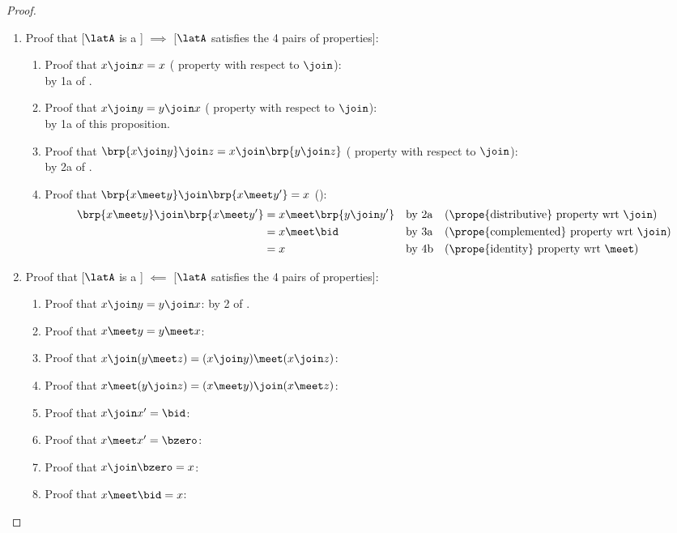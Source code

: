 \begin{proof}
\begin{enumerate}
  \item Proof that [$\latA$ is a ] $\implies$ [$\latA$ satisfies the 4 pairs of properties]:
    \begin{enumerate}
      \item Proof that $x \join  x = x$ ( property with respect to $\join$):
            \\by 1a of .
      \item Proof that $x \join  y = y \join  x$ ( property with respect to $\join$):
            \\by 1a of this proposition.
      \item Proof that $\brp{x \join  y}\join z = x \join \brp{y \join z}$ ( property with respect to $\join$):
            \\by 2a of .
      \item Proof that $\brp{x\meet y} \join \brp{x\meet y'} = x$ ():
        \begin{align*}
          \brp{x\meet y} \join \brp{x\meet y'}
            &= x \meet \brp{y \join y'}
            && \text{by 2a}
            && \text{(\prope{distributive} property wrt $\join$)}
          \\&= x \meet \bid
            && \text{by 3a}
            && \text{(\prope{complemented} property wrt $\join$)}
          \\&= x
            && \text{by 4b}
            && \text{(\prope{identity} property wrt $\meet$)}
        \end{align*}
    \end{enumerate}

  \item Proof that [$\latA$ is a ] $\impliedby$ [$\latA$ satisfies the 4 pairs of properties]:
    \begin{enumerate}
      \item Proof that $x \join  y =  y \join  x$: by 2 of .
      \item Proof that $x \meet  y =  y \meet  x$:
      \item Proof that $x\join( y\meet z) = ( x\join y) \meet ( x\join z)$:
      \item Proof that $x\meet( y\join z) = ( x\meet y) \join  ( x\meet z)$:
      \item Proof that $x \join x' = \bid$:
      \item Proof that $x \meet x' = \bzero$:
      \item Proof that $x \join \bzero= x$:
      \item Proof that $x \meet \bid = x$:
    \end{enumerate}

\end{enumerate}
\end{proof}

